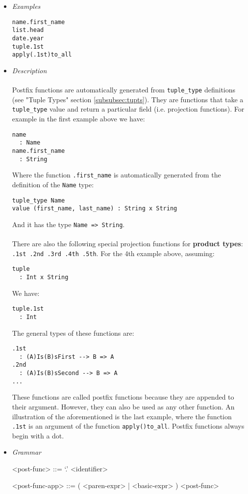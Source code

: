 \documentclass{article}
\begin{document}
\begin{itemize}

\item \textit{Examples}
\begin{verbatim}
name.first_name
list.head
date.year
tuple.1st
apply(.1st)to_all
\end{verbatim}

\item \textit{Description} \\\\
Postfix functions are automatically generated from \texttt{tuple_type}
definitions (see "Tuple Types" section \ref{subsubsec:tupts}). They are
functions that take a \texttt{tuple_type} value and return a particular field
(i.e. projection functions). For example in the first example above we have:
\begin{verbatim}
name 
  : Name
name.first_name
  : String
\end{verbatim}
Where the function \texttt{.first_name} is automatically generated from the
definition of the \texttt{Name} type:
\begin{verbatim}
tuple_type Name
value (first_name, last_name) : String x String
\end{verbatim}
And it has the type \texttt{Name => String}.
\\\\
There are also the following special projection functions for \textbf{product
types}: \texttt{.1st .2nd .3rd .4th .5th}. For the 4th example above, assuming:
\begin{verbatim}
tuple 
  : Int x String
\end{verbatim}
We have:
\begin{verbatim}
tuple.1st
  : Int
\end{verbatim}
The general types of these functions are:
\begin{verbatim}
.1st
  : (A)Is(B)sFirst --> B => A
.2nd
  : (A)Is(B)sSecond --> B => A
...
\end{verbatim}
These functions are called postfix functions because they are appended to
their argument. However, they can also be used as any other function.
An illustration of the aforementioned is the last example, where the function
\texttt{.1st} is an argument of the function \texttt{apply()to_all}.
Postfix functions always begin with a dot.


\item \textit{Grammar}
\begin{grammar}
<post-func> ::= `.' <identifier>

<post-func-app> ::= ( <paren-expr> | <basic-expr> ) <post-func>
\end{grammar}

\end{itemize}
\end{document}
